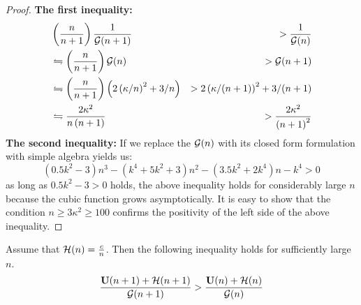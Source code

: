 \begin{proof}
	\textbf{The first inequality:}
	\begin{eqnarray*}	
		& \left( \frac{n}{n+1}\right) \frac{1}{{\cal G}(n+1)}  & > 
	\frac{1}{{\cal G}(n)} \\ 
	  &\leftrightharpoons  \left( \frac{n}{n+1}\right)  {\cal G}(n) & > {\cal G}(n+1) \\
	   & \leftrightharpoons  \left( \frac{n}{n+1}\right) \left(2\left(
	   \kappa/n\right)^2 + 3/n \right) & > 2\left( \kappa/(n+1)\right)^2 + 3/(n+1) \\ 
	   & \leftrightharpoons  \frac{2 \kappa^2}{n\left(n+1\right)} & >  \frac{2
	   \kappa^2}{\left(n+1\right)^2}
	\end{eqnarray*}
	\textbf{The second inequality:}
	If we replace the ${\cal G}(n)$ with its closed form formulation with simple
	algebra yields us:
	\begin{equation*}
		(0.5 k^2-3) n^3 -(k^4 + 5 k^2 +3 ) n^2 -(3.5 k^2 +2 k^4) n -k^4 >0 
	\end{equation*}
	as long as $0.5 k^2 - 3 >0$ holds, the above inequality holds for considerably
	large $n$ because the cubic function grows asymptotically. It is easy to show
	that the condition $n\geq 3 \kappa^2 \geq 100$ confirms the positivity of the
	left side of the above inequality.
\end{proof}
\begin{lemma}
	Assume that ${\cal H}(n) = \frac{c}{n}$. Then the
	following inequality holds for sufficiently large $n$.
	  \begin{equation*}
		\frac{\mathbf U(n+1)+{\cal H}(n+1)}{{\cal G}(n+1)} >
		\frac{\mathbf U(n)+{\cal H}(n)}{{\cal G}(n)}
	\end{equation*}
\end{lemma}
